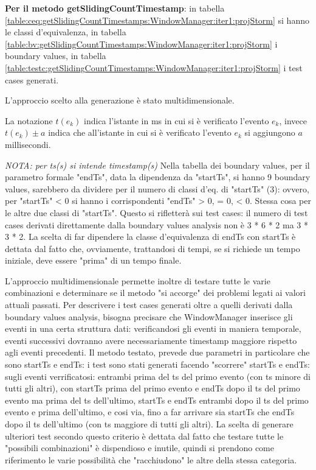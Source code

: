 \documentclass[10pt, a4paper]{article}
\newcommand{\gettablelabel}[5]{table:#1:#2:#3:iter#4:proj#5}
\def\storm{Storm}
\begin{document}
	\textbf{Per il metodo getSlidingCountTimestamp}: 
	in tabella \ref{\gettablelabel{ceq}{getSlidingCountTimestamps}{WindowManager}{1}{\storm}} si hanno le
	classi d'equivalenza, in tabella \ref{\gettablelabel{bv}{getSlidingCountTimestamps}{WindowManager}{1}{\storm}} i 
	boundary values, in tabella \ref{\gettablelabel{testc}{getSlidingCountTimestamps}{WindowManager}{1}{\storm}} i test
	cases generati. 
	
	L'approccio scelto alla generazione è stato multidimensionale.
	
	La notazione $t(e_k)$ indica l'istante in ms in cui si è verificato l'evento $e_k$, 
	invece $t(e_k) \pm a$ indica che all'istante in cui si è verificato l'evento $e_k$ si aggiungono $a$ 
	millisecondi.
	
	\textit{NOTA: per ts(s) si intende timestamp(s)}
	Nella tabella dei boundary values, per il parametro formale "endTs", data la dipendenza da "startTs", 
	si hanno 9 boundary values,
	sarebbero da dividere per il numero di classi d'eq. di "startTs" (3): ovvero, per "startTs" < 0 si hanno
	i corrispondenti "endTs" > 0, = 0, < 0. Stessa cosa per le altre due classi di "startTs". 
	Questo si rifletterà sui test
	cases: il numero di test cases derivati direttamente dalla boundary values analysis non è 3 * 6 * 2 ma  
	3 * 3 * 2. La scelta di far dipendere la classe d'equivalenza di endTs con startTs è dettata dal fatto che,
	ovviamente, trattandosi di tempi, se si richiede un tempo iniziale, deve essere "prima" di un tempo finale.
	
	L'approccio multidimensionale permette inoltre di testare tutte le varie combinazioni e determinare se il
	metodo "si accorge" dei problemi legati ai valori attuali passati. Per descrivere i test cases generati 
	oltre a quelli derivati dalla boundary values analysis, bisogna precisare che WindowManager inserisce gli eventi
	in una certa struttura dati: verificandosi gli eventi in maniera temporale, eventi successivi dovranno avere 
	necessariamente timestamp maggiore rispetto agli eventi precedenti. Il metodo testato, prevede due parametri in 
	particolare che sono startTs e endTs: 
	i test sono stati generati facendo "scorrere" startTs e endTs: sugli eventi 
	verrificatosi: entrambi prima del ts del primo evento (con ts minore di tutti gli altri), 
	con startTs prima del primo evento e endTs dopo il ts del primo evento ma prima del ts dell'ultimo, startTs e 
	endTs entrambi dopo il ts del primo evento e prima dell'ultimo, e cosi via, fino a far arrivare sia startTs che 
	endTs dopo il ts dell'ultimo (con ts maggiore di tutti gli altri). La scelta di generare ulteriori test secondo
	questo criterio è dettata dal fatto che testare tutte le "possibili combinazioni" è dispendioso e inutile,
	quindi si prendono come riferimento le varie possibilità che "racchiudono" le altre della stessa categoria.
	
\end{document}
